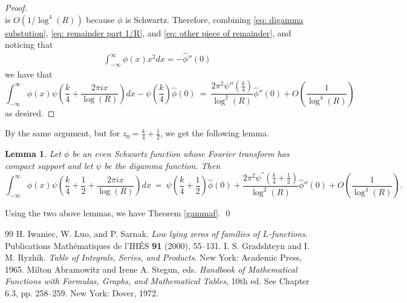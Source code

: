 \documentclass[10pt,a4paper]{amsart}
\newtheorem{lemma}{Lemma}
\begin{document}
\begin{proof}
\begin{equation}
\end{equation} is  $O\left({1}/{\log^4(R)}\right)$ because $\phi$ is Schwartz.
Therefore, combining \eqref{eq: digamma substution},  \eqref{eq: remainder part 1/R}, and \eqref{eq: other piece of remainder}, and noticing that \begin{align}
    \int_{-\infty}^{\infty} \phi(x)x^2dx = -\hat\phi''(0)
\end{align} we have that
\begin{equation}
\int_{-\infty}^\infty \phi(x)\psi\left(\frac{k}{4}+ \frac{2\pi i x}{\log(R)}\right) dx - \psi\left(\frac{k}{4}\right)\hat\phi(0) \  =  \ \frac{2\pi^2\psi''\left(\frac{k}{4}\right)}{\log^2(R)}\hat\phi''(0) + O\left(\frac{1}{\log^4(R)}\right)    
\end{equation} as desired.
\end{proof}
By the same argument, but for $z_0 = \frac{k}{4}+ \frac{1}{2}$, we get the following lemma. 
\begin{lemma} Let $\phi$ be an even Schwartz function whose Fourier transform has compact support and let $\psi$ be the digamma function. Then
      \begin{equation}
        \int_{-\infty}^\infty \phi(x)\psi\left(\frac{k}{4}+ \frac{1}{2}+ \frac{2\pi i x}{\log(R)}\right) dx \ =\ \psi\left(\frac{k}{4} + \frac{1}{2}\right)\hat\phi(0) +\frac{2\pi^2\psi^{''}(\frac{k}{4} + \frac{1}{2})}{\log^2(R)}\hat\phi''(0) + O\left(\frac{1}{\log^4(R)}\right). 
        \end{equation}
    \end{lemma}
Using the two above lemmas, we have Theorem \ref{gammaf}. \qed

\begin{thebibliography}{99}
 H. Iwaniec, W. Luo, and P. Sarnak. \emph{Low lying zeros of families of $L$-functions}. Publications Math\'ematiques de l'IH\'ES \textbf{91} (2000), 55--131.
 I. S. Gradshteyn and I. M. Ryzhik. \emph{Table of Integrals, Series, and Products}. New York: Academic Press, 1965.
 Milton Abramowitz and Irene A. Stegun, eds. \emph{Handbook of Mathematical Functions with Formulas, Graphs, and Mathematical Tables}, 10th ed. See Chapter 6.3, pp. 258--259. New York: Dover, 1972.
\end{thebibliography}
\end{document}
